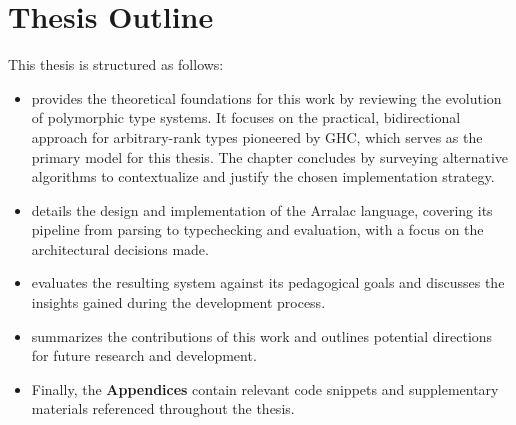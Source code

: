 \section{Thesis Outline}

This thesis is structured as follows:

\begin{itemize}
    \item \textbf{} provides the theoretical foundations for this work by reviewing the evolution of polymorphic type systems. It focuses on the practical, bidirectional approach for arbitrary-rank types pioneered by GHC, which serves as the primary model for this thesis. The chapter concludes by surveying alternative algorithms to contextualize and justify the chosen implementation strategy.
    \item \textbf{} details the design and implementation of the Arralac language, covering its pipeline from parsing to typechecking and evaluation, with a focus on the architectural decisions made.
    \item \textbf{} evaluates the resulting system against its pedagogical goals and discusses the insights gained during the development process.
    \item \textbf{} summarizes the contributions of this work and outlines potential directions for future research and development.
    \item Finally, the \textbf{Appendices} contain relevant code snippets and supplementary materials referenced throughout the thesis.
\end{itemize}